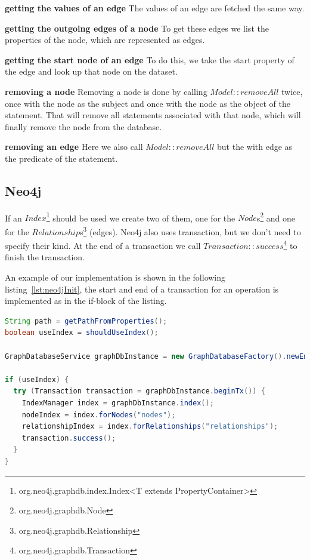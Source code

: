 \textbf{getting the values of an edge} \newline
The values of an edge are fetched the same way.

\textbf{getting the outgoing edges of a node} \newline
To get these edges we list the properties of the node,
which are represented as edges.

\textbf{getting the start node of an edge} \newline
To do this,
we take the start property of the edge and look up that node on the dataset.

\textbf{removing a node} \newline
Removing a node is done by calling $ Model::removeAll $ twice,
once with the node as the subject and once with the node as the object of the statement.
That will remove all statements associated with that node,
which will finally remove the node from the database.

\textbf{removing an edge} \newline
Here we also call $ Model::removeAll $ but the with edge as the predicate of the statement.

\subsection{Neo4j}
If an $ Index $\footnote{org.neo4j.graphdb.index.Index<T extends PropertyContainer>} should be used we create two of them,
one for the $ Node $s\footnote{org.neo4j.graphdb.Node} and one for the $ Relationship $s\footnote{org.neo4j.graphdb.Relationship} (edges).
Neo4j also uses transaction,
but we don't need to specify their kind.
At the end of a transaction we call $ Transaction::success $\footnote{org.neo4j.graphdb.Transaction} to finish the transaction.

An example of our implementation is shown in the following listing~\ref{lst:neo4jInit}, the start and end of a transaction for an operation is implemented as in the if-block of the listing.

\begin{lstlisting}[language=Java,label={lst:neo4jInit},caption={Implementation of the initialisation and beginning of a transaction.}]
String path = getPathFromProperties();
boolean useIndex = shouldUseIndex();

GraphDatabaseService graphDbInstance = new GraphDatabaseFactory().newEmbeddedDatabase(new File(path));

if (useIndex) {
  try (Transaction transaction = graphDbInstance.beginTx()) {
    IndexManager index = graphDbInstance.index();
    nodeIndex = index.forNodes("nodes");
    relationshipIndex = index.forRelationships("relationships");
    transaction.success();
  }
}
\end{lstlisting}

